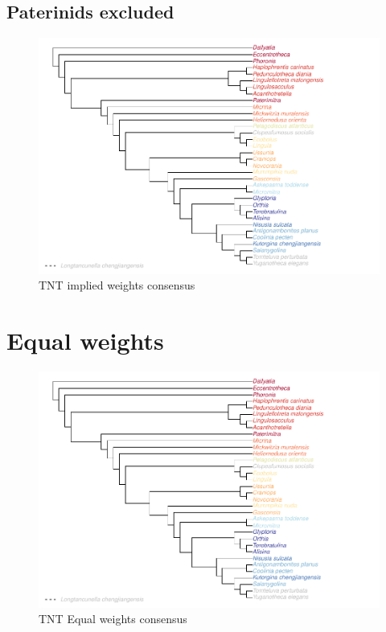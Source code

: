 \documentclass[]{book}
\theoremstyle{definition}
\theoremstyle{definition}
\theoremstyle{definition}
\theoremstyle{remark}
\begin{document}
\hypertarget{paterinids-excluded}{%
\subsection{Paterinids excluded}\label{paterinids-excluded}}

\begin{figure}
\centering
\includegraphics{Brachiopod_phylogeny_files/figure-latex/unnamed-chunk-12-1.pdf}
\caption{\label{fig:unnamed-chunk-12}TNT implied weights consensus}
\end{figure}

\hypertarget{equal-weights}{%
\section{Equal weights}\label{equal-weights}}

\begin{figure}
\centering
\includegraphics{Brachiopod_phylogeny_files/figure-latex/unnamed-chunk-13-1.pdf}
\caption{\label{fig:unnamed-chunk-13}TNT Equal weights consensus}
\end{figure}
\end{document}
